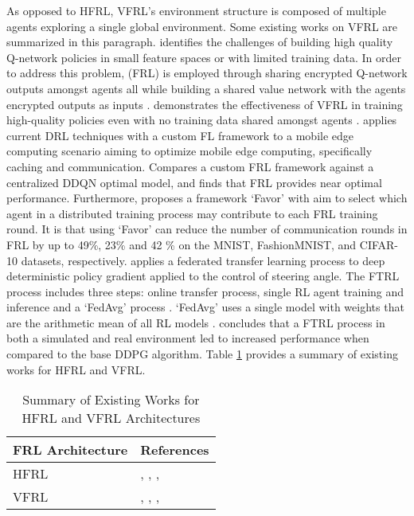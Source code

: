 As opposed to HFRL, VFRL's environment structure is composed of multiple agents exploring
a single global environment. Some existing works on VFRL are summarized in this paragraph.
\cite{Zhuo2019} identifies the challenges of building high quality Q-network policies in
small feature spaces or with limited training data.  In order to address this problem, (FRL)
is employed through sharing encrypted Q-network outputs amongst agents all while building a
shared value network with the agents encrypted outputs as inputs \cite{Zhuo2019}.
\cite{Zhuo2019} demonstrates the effectiveness of VFRL in training high-quality policies
even with no training data shared amongst agents \cite{Zhuo2019}.
\cite{Wang2018a} applies current DRL techniques with a custom FL framework to a mobile edge computing scenario
aiming to optimize mobile edge computing, specifically caching and communication. Compares a custom FRL
framework against a centralized DDQN optimal model, and finds
that FRL provides near optimal performance.  Furthermore, \cite{Wang2020a} proposes a framework
`Favor' with aim to select which agent in a distributed
training process may contribute to each FRL training round. It is that using `Favor' can reduce
the number of communication rounds in FRL by up to 49\%, 23\% and 42 \% on the MNIST, FashionMNIST, and CIFAR-10
datasets, respectively. \cite{Liang2019} applies a federated transfer learning process to deep deterministic
policy gradient applied to the control of steering angle.  The FTRL process includes three steps: online
transfer process, single RL agent training and inference and a `FedAvg' process \cite{Liang2019}.
`FedAvg' uses a single model with weights that are the arithmetic mean of all RL models \cite{Liang2019}.
\cite{Liang2019} concludes that a FTRL process in both a simulated and real environment led to increased
performance when compared to the base DDPG algorithm.  Table \ref{tab:HFRLVFRLworks} provides a summary of existing works for HFRL and VFRL.


\begin{table}[H]
  \centering
  \caption{Summary of Existing Works for HFRL and VFRL Architectures}
    \begin{tabular}{ll} \toprule
    \textbf{FRL Architecture} & \textbf{References} \\ \midrule
    \midrule
    HFRL & \cite{Lim2020}, \cite{Nadiger2019}, \cite{Liu2019b}, \cite{Ren2019} \\
    VFRL & \cite{Zhuo2019}, \cite{Wang2018a}, \cite{Wang2020a}, \cite{Liang2019} \\ \bottomrule
    \end{tabular}%
  \label{tab:HFRLVFRLworks}%
\end{table}%

